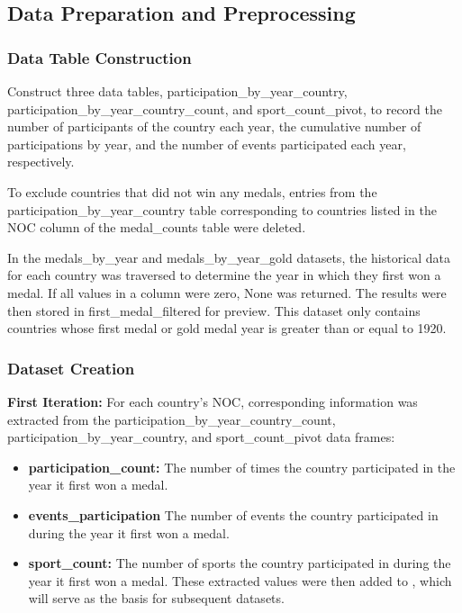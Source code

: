 \documentclass{mcmthesis}
\begin{document}
\subsection{Data Preparation and Preprocessing}

\subsubsection{Data Table Construction}
    Construct three data tables, participation\_by\_year\_country, participation\_by\_year\_country\_count, and sport\_count\_pivot, to record the number of participants of the country each year, the cumulative number of participations by year, and the number of events participated each year, respectively.

    To exclude countries that did not win any medals, entries from the participation\_by\_year\_country table corresponding to countries listed in the NOC column of the medal\_counts table were deleted.

    In the medals\_by\_year and medals\_by\_year\_gold datasets, the historical data for each country was traversed to determine the year in which they first won a medal. If all values in a column were zero, None was returned. The results were then stored in first\_medal\_filtered for preview. This dataset only contains countries whose first medal or gold medal year is greater than or equal to 1920.

\subsubsection{Dataset Creation}

{\bf First Iteration:}
    For each country's NOC, corresponding information was extracted from the participation\_by\_year\_country\_count, participation\_by\_year\_country, and sport\_count\_pivot data frames:
\begin{itemize}   
\item {\bf participation\_count:} The number of times the country participated in the year it first won a medal.
\item {\bf events\_participation} The number of events the country participated in during the year it first won a medal.
\item {\bf sport\_count: }The number of sports the country participated in during the year it first won a medal.
These extracted values were then added to , which will serve as the basis for subsequent datasets.
\end{itemize}
\end{document}
